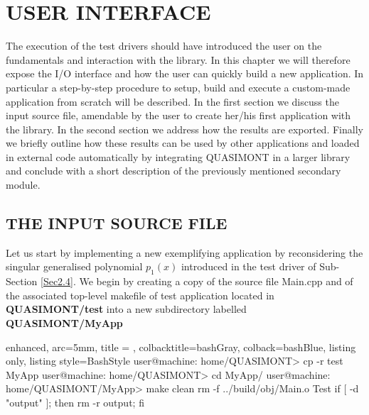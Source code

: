 \documentclass[a4paper, twosided]{book}
\begin{document}
\chapter[User interface]{\Huge \ttfamily USER INTERFACE}

The execution of the test drivers should have introduced the user on the fundamentals and interaction with the library. In this chapter we will therefore expose the I/O interface and how the user can quickly build a new application. In particular a step-by-step procedure to setup, build and execute a custom-made application from scratch will be described. In the first section we discuss the input source file, amendable by the user to create her/his first application with the library. In the second section we address how the results are exported. Finally we briefly outline how these results can be used by other applications and loaded in external code automatically by integrating QUASIMONT in a larger library and conclude with a short description of the previously mentioned secondary module.

\section[The input source file]{\changefont THE INPUT SOURCE FILE}\label{Sec3.1}

\noindent
Let us start by implementing a new exemplifying application by reconsidering the singular generalised polynomial $p_1(x)$ introduced in the test driver of Sub-Section \ref{Sec2.4}. We begin by creating a copy of the source file \colorbox{poliGrayBlue}{Main.cpp} and of the associated top-level makefile of test application located in  \colorbox{poliGrayBlue}{\textbf{QUASIMONT/test}} into a new subdirectory labelled \colorbox{poliGrayBlue}{\textbf{QUASIMONT/MyApp}}

\vspace{0.5cm}
\begin{tcblisting}{enhanced,
                   arc=5mm,
                   title = \color{black}{\large \ttfamily Creation of application's directory},
                   colbacktitle=bashGray,
                   colback=bashBlue,
                   listing only,
                   listing style=BashStyle}
user@machine: home/QUASIMONT> cp -r test MyApp
user@machine: home/QUASIMONT> cd MyApp/
user@machine: home/QUASIMONT/MyApp> make clean
rm -f ../build/obj/Main.o Test
if [ -d "output" ]; then rm -r output; fi 
\end{tcblisting}
\vspace{0.5cm}
\end{document}
